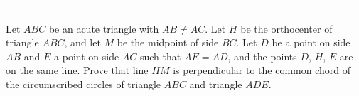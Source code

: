 
---

Let $ABC$ be an acute triangle with $AB\ne AC$. Let $H$ be the orthocenter of triangle $ABC$, and let $M$ be the midpoint of side $BC$. Let $D$ be a point on side $AB$ and $E$ a point on side $AC$ such that $AE=AD$, and the points $D$, $H$, $E$ are on the same line. Prove that line $HM$ is perpendicular to the common chord of the circumscribed circles of triangle $ABC$ and triangle $ADE$.

